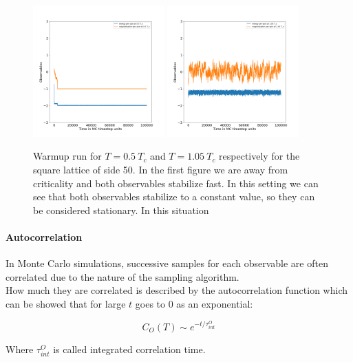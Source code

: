 \begin{figure}[H]
    \centering
    \includegraphics[width=0.45\textwidth]{FIG/exercise_5_images/thermalization_temp0.50T_c_dimension50.png} \hspace{0.5cm}
    \includegraphics[width=0.45\textwidth]{FIG/exercise_5_images/thermalization_temp1.05T_c_dimension50.png}
    \caption{Warmup run for $T=0.5\ T_c$ and $T=1.05\ T_c$ respectively for the square lattice of side 50.
    In the first figure we are away from criticality and both observables stabilize fast. In this setting we can see that 
    both observables stabilize to a constant value, so they can be considered stationary. In this situation }
    \label{lec5:thermalization}
\end{figure}

\paragraph{Autocorrelation} In Monte Carlo simulations, successive samples for each observable are often correlated due to the nature of the sampling algorithm. \\
How much they are correlated is described by the autocorrelation function which can be showed that for large $t$ goes to 0 as an exponential:

$$ C_O(T) \sim e^{-t/\tau^O_{int}} $$

Where $\tau^O_{int}$ is called integrated correlation time.
